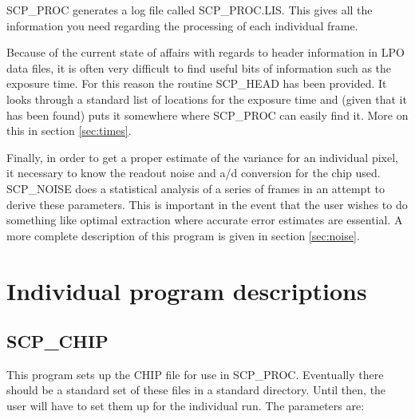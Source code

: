 SCP\_PROC generates a log file called SCP\_PROC.LIS.  This gives all the
information you need regarding the processing of each individual frame.

Because of the current state of affairs with regards to header information in
LPO data files, it is often very difficult to find useful bits of information
such as the exposure time.  For this reason the routine SCP\_HEAD has been
provided.  It looks through a standard list of locations for the exposure time
and (given that it has been found) puts it somewhere where SCP\_PROC can easily
find it.  More on this in section \ref{sec:times}.

Finally, in order to get a proper estimate of the variance for an individual
pixel, it necessary to know the readout noise and a/d conversion for the chip
used.  SCP\_NOISE does a statistical analysis of a series of frames in an
attempt to derive these parameters.  This is important in the event that the
user wishes to do something like optimal extraction where accurate error
estimates are essential. A more complete description of this program is given
in section \ref{sec:noise}.

\section{Individual program descriptions}

\subsection{SCP\_CHIP} \label{sec:chip_pars}

This program sets up the CHIP file for use in SCP\_PROC. 
Eventually there should be a standard set of these files in a standard
directory.  Until then, the user will have to set them up for the
individual run. The parameters are:

